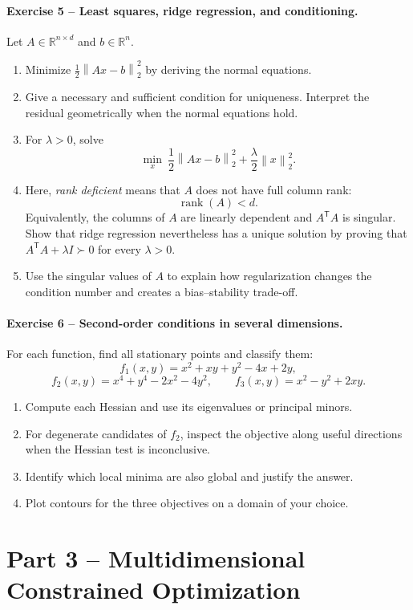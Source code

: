 \documentclass[10pt]{article}
\newcommand{\R}{\mathbb{R}}
\newcommand{\trans}{^{\mathsf T}}
\newcommand{\norm}[1]{\left\lVert#1\right\rVert}
\begin{document}
\paragraph{Exercise 5 -- Least squares, ridge regression, and conditioning.}
Let $A\in\R^{n\times d}$ and $b\in\R^n$.
\begin{enumerate}
\item Minimize $\frac12\norm{Ax-b}_2^2$ by deriving the normal equations.
\item Give a necessary and sufficient condition for uniqueness. Interpret the
residual geometrically when the normal equations hold.
\item For $\lambda>0$, solve
\[
\min_x\ \frac12\norm{Ax-b}_2^2+\frac\lambda2\norm{x}_2^2.
\]
\item Here, \emph{rank deficient} means that $A$ does not have full column
rank:
\[
  \operatorname{rank}(A)<d.
\]
Equivalently, the columns of $A$ are linearly dependent and $A\trans A$ is
singular. Show that ridge regression nevertheless has a unique solution by
proving that $A\trans A+\lambda I\succ0$ for every $\lambda>0$.
\item Use the singular values of $A$ to explain how regularization changes the
condition number and creates a bias--stability trade-off.
\end{enumerate}

\paragraph{Exercise 6 -- Second-order conditions in several dimensions.}
For each function, find all stationary points and classify them:
\[
f_1(x,y)=x^2+xy+y^2-4x+2y,
\]
\[
f_2(x,y)=x^4+y^4-2x^2-4y^2,
\qquad
f_3(x,y)=x^2-y^2+2xy.
\]
\begin{enumerate}
\item Compute each Hessian and use its eigenvalues or principal minors.
\item For degenerate candidates of $f_2$, inspect the objective along useful
directions when the Hessian test is inconclusive.
\item Identify which local minima are also global and justify the answer.
\item Plot contours for the three objectives on a domain of your choice.
\end{enumerate}

\section{Part 3 -- Multidimensional Constrained Optimization}
\end{document}
